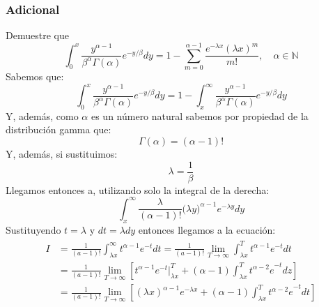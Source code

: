 \documentclass[12pt]{article}
\begin{document}
          \subsubsection{Adicional}
          Demuestre que 
          \begin{equation}
              \int _{ 0 }^{ x }{ \frac { { y }^{ \alpha -1 } }{ { \beta  }^{ \alpha  }\Gamma (\alpha ) } { e }^{ -y/\beta  }dy } =1-\sum _{ m=0 }^{ \alpha -1 }{ \frac { { e }^{ -\lambda x }{ (\lambda x) }^{ m } }{ m! }  }, \quad \alpha \in \mathbb{N}
          \end{equation}
          Sabemos que:
          \begin{equation*}
              \int _{ 0 }^{ x }{ \frac { { y }^{ \alpha -1 } }{ { \beta  }^{ \alpha  }\Gamma (\alpha ) } { e }^{ -y/\beta  }dy } =1-\int _{ x }^{ \infty  }{ \frac { { y }^{ \alpha -1 } }{ { \beta  }^{ \alpha  }\Gamma (\alpha ) } { e }^{ -y/\beta  }dy } 
          \end{equation*}
          Y, además, como $\alpha$ es un número natural sabemos por propiedad de la distribución gamma que:
          \begin{equation*}
              \Gamma (\alpha) = (\alpha - 1)!
          \end{equation*}
          Y, además, si sustituimos:
          \begin{equation*}
              \lambda = \frac{1}{\beta}
          \end{equation*}
          Llegamos entonces a, utilizando solo la integral de la derecha:
          \begin{equation*}
              \int _{ x }^{ \infty  }{ \frac { \lambda  }{ (\alpha -1)! } (\lambda { y) }^{ \alpha -1 }{ e }^{ -\lambda y }dy }  
          \end{equation*}
          Sustituyendo $t=\lambda$ y $dt = \lambda dy$ entonces llegamos a la ecuación:
          \begin{align}
              \begin{aligned}
                  I & = \frac { 1 }{ (a-1)! } \int _{ \lambda x }^{ \infty  }{ t^{ \alpha -1 }{ e }^{ -t }dt } = \frac { 1 }{ (a-1)! }\lim_{T \rightarrow \infty} \int _{ \lambda x }^{ T  }{ t^{ \alpha -1 }{ e }^{ -t }dt }\\ 
                  & = \frac { 1 }{ (a-1)! }\lim_{T \rightarrow \infty} \left[ {  t^{ \alpha  - 1 }{ e }^{ -t }  }\bigg|_{ \lambda x}^{ T  }+(\alpha-1) \int _{ \lambda x }^{ T  }{ { { t }^{ \alpha - 2 }e }^{ -t }dz }  \right]  \\
                  & = \frac { 1 }{ (a-1)! } \lim_{T \rightarrow \infty}\left[ (\lambda x)^{ \alpha - 1 }{ e }^{ -\lambda x }+(\alpha-1) \int _{ \lambda x }^{ T  }{ { { t }^{ \alpha - 2 }e }^{ -t }dt }  \right] 
              \end{aligned}
          \end{align}
\end{document}
